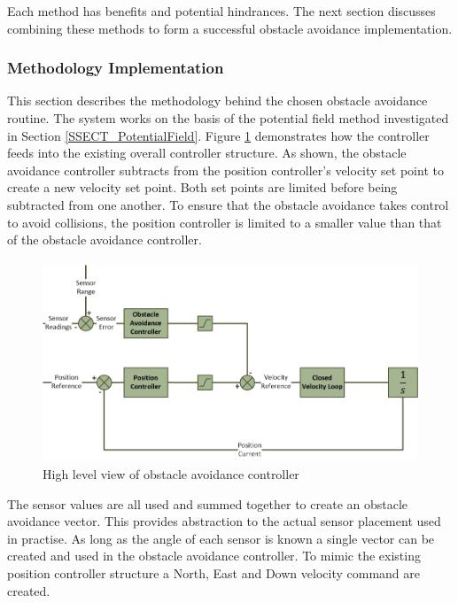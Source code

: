 			Each method has benefits and potential hindrances. The next section discusses combining these methods to form a successful obstacle avoidance implementation.
			
			\subsubsection{Methodology Implementation}
		
			This section describes the methodology behind the chosen obstacle avoidance routine. The system works on the basis of the potential field method investigated in Section \ref{SSECT_PotentialField}. Figure \ref{IM_ObAvoidController} demonstrates how the controller feeds into the existing overall controller structure. As shown, the obstacle avoidance controller subtracts from the position controller's velocity set point to create a new velocity set point. Both set points are limited before being subtracted from one another. To ensure that the obstacle avoidance takes control to avoid collisions, the position controller is limited to a smaller value than that of the obstacle avoidance controller.
			
			\begin{figure}[H]
				\centering
				\includegraphics[height = 6cm]{../References/Diagrams/ObstacleAvoidanceController.jpg}     
				\caption{High level view of obstacle avoidance controller}
				\label{IM_ObAvoidController}
			\end{figure}
			
			The sensor values are all used and summed together to create an obstacle avoidance vector. This provides abstraction to the actual sensor placement used in practise. As long as the angle of each sensor is known a single vector can be created and used in the obstacle avoidance controller. To mimic the existing position controller structure a North, East and Down velocity command are created.
		
